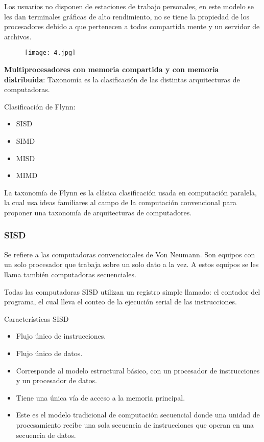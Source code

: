 Los usuarios no disponen de estaciones de trabajo personales, en este modelo se les dan terminales gráficas de alto rendimiento, no se tiene la propiedad de los procesadores debido a que pertenecen a todos compartida mente y un servidor de archivos.

\begin{figure}[h!]
		\centering
		{\texttt{[image: 4.jpg]}\par} \vspace{1cm}
\end{figure}

{\raggedright
\textbullet{} \textbf{Multiprocesadores con memoria compartida y con memoria distribuida}: Taxonomía es la clasificación de las distintas arquitecturas de computadoras.
}

\begin{center}
Clasificación de Flynn:
\end{center}

\begin{itemize}
	\item SISD
	\item SIMD
	\item MISD
	\item MIMD
\end{itemize}

La taxonomía de Flynn es la clásica clasificación usada en computación paralela, la cual usa ideas familiares al campo de la computación convencional para proponer una taxonomía de arquitecturas de computadores.

{\raggedright
\subsubsection{\textbf{SISD}}
}

Se refiere a las computadoras convencionales de Von Neumann. Son equipos con un solo procesador que trabaja sobre un solo dato a la vez. A estos equipos se les llama también computadoras secuenciales.

Todas las computadoras SISD utilizan un registro simple llamado: el contador del programa, el cual lleva el conteo de la ejecución serial de las instrucciones.

\vspace{1cm}
\begin{center}
Características SISD
\end{center}

\begin{itemize}
	\item Flujo único de instrucciones.
	\item Flujo único de datos.
	\item Corresponde al modelo estructural básico, con un procesador de instrucciones y un procesador de datos.
	\item Tiene una única vía de acceso a la memoria principal.
	\item Este es el modelo tradicional de computación secuencial donde una unidad de procesamiento recibe una sola secuencia de instrucciones que operan en una secuencia de datos.
\end{itemize}

